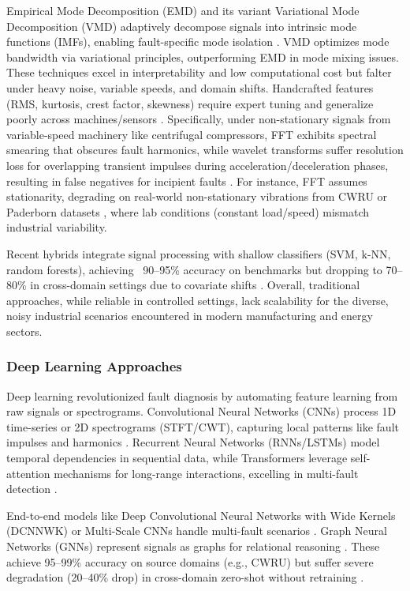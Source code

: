 Empirical Mode Decomposition (EMD) and its variant Variational Mode Decomposition (VMD) adaptively decompose signals into intrinsic mode functions (IMFs), enabling fault-specific mode isolation \cite{dragomiretskiy2014emd}. VMD optimizes mode bandwidth via variational principles, outperforming EMD in mode mixing issues. These techniques excel in interpretability and low computational cost but falter under heavy noise, variable speeds, and domain shifts. Handcrafted features (RMS, kurtosis, crest factor, skewness) require expert tuning and generalize poorly across machines/sensors \cite{wen2020domain}. Specifically, under non-stationary signals from variable-speed machinery like centrifugal compressors, FFT exhibits spectral smearing that obscures fault harmonics, while wavelet transforms suffer resolution loss for overlapping transient impulses during acceleration/deceleration phases, resulting in false negatives for incipient faults \cite{casewestern,paderborn}. For instance, FFT assumes stationarity, degrading on real-world non-stationary vibrations from CWRU or Paderborn datasets \cite{casewestern,paderborn}, where lab conditions (constant load/speed) mismatch industrial variability.

Recent hybrids integrate signal processing with shallow classifiers (SVM, k-NN, random forests), achieving ~90--95\% accuracy on benchmarks but dropping to 70--80\% in cross-domain settings due to covariate shifts \cite{li2021mmd}. Overall, traditional approaches, while reliable in controlled settings, lack scalability for the diverse, noisy industrial scenarios encountered in modern manufacturing and energy sectors.

\subsubsection{Deep Learning Approaches}
Deep learning revolutionized fault diagnosis by automating feature learning from raw signals or spectrograms. Convolutional Neural Networks (CNNs) process 1D time-series or 2D spectrograms (STFT/CWT), capturing local patterns like fault impulses and harmonics \cite{jia2016deep,verstraete2020cnn}. Recurrent Neural Networks (RNNs/LSTMs) model temporal dependencies in sequential data, while Transformers leverage self-attention mechanisms for long-range interactions, excelling in multi-fault detection \cite{li2022transformer}.

End-to-end models like Deep Convolutional Neural Networks with Wide Kernels (DCNNWK) or Multi-Scale CNNs handle multi-fault scenarios \cite{wen2022maml}. Graph Neural Networks (GNNs) represent signals as graphs for relational reasoning \cite{li2023gnn}. These achieve 95--99\% accuracy on source domains (e.g., CWRU) but suffer severe degradation (20--40\% drop) in cross-domain zero-shot without retraining \cite{wang2020transfer,hoang2023vit}.

